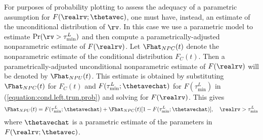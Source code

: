 For purposes of probability plotting to assess the adequacy of a
parametric assumption for $F(\realrv;\thetavec)$, one must have,
instead, an estimate of the unconditional distribution of $\rv$.  In
this case we use a parametric model to estimate $\Pr( \rv >
\tau^{L}_{\min} )$ and then compute a parametrically-adjusted
nonparametric estimate of $F(\realrv)$. Let $\Fhat_{NPC}(t)$ denote
the nonparametric estimate of the conditional distribution
$F_{C}(t)$. Then a parametrically-adjusted unconditional
nonparametric estimate of $F(\realrv)$ will be denoted by
$\Fhat_{NPU}(t)$.  This estimate is obtained by substituting
$\Fhat_{NPC}(t)$ for $F_{C}(t)$ and
$F(\tau^{L}_{\min};\thetavechat)$ for $F(\tau^{L}_{\min})$ in
(\ref{equation:cond.left.trun.prob}) and solving for $F(\realrv)$.
This gives
\begin{equation}
\label{equation:uncond.left.trun.prob}
\Fhat_{NPU}(t) = F(\tau^{L}_{\min};\thetavechat) +  
	\Fhat_{NPC}(t)[1 - F(\tau^{L}_{\min};\thetavechat) ] , \quad
\realrv > \tau^{L}_{\min}
\end{equation}
where $\thetavechat$ is a parametric estimate of the parameters in
$F(\realrv;\thetavec)$.

